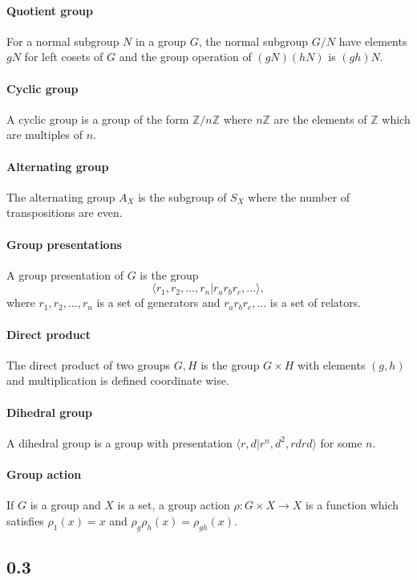 \documentclass[]{article}
\begin{document}
\paragraph{Quotient group} For a normal subgroup $N$ in a group $G$, the normal subgroup $G/N$ have elements $gN$ for left cosets of $G$ and the group operation of $(gN)(hN)$ is $(gh)N$. 
\paragraph{Cyclic group } A cyclic group is a group of the form $\mathbb{Z}/n\mathbb{Z}$ where $n\mathbb{Z}$ are the elements of $\mathbb{Z}$ which are multiples of $n$. 
\paragraph{Alternating group} The alternating group $A_X$ is the subgroup of $S_X$ where the number of transpositions are even. 
\paragraph{Group presentations} A group presentation of $G$ is the group 
\begin{equation}
	\langle r_1, r_2, ..., r_n | r_a r_b r_c, ...\rangle,
\end{equation}
where $r_1, r_2, ..., r_n$ is a set of generators and $r_a r_b r_c, ...$ is a set of relators.
\paragraph{Direct product} The direct product of two groups $G, H$ is the group $G \times H$ with elements $(g, h)$ and multiplication is defined coordinate wise.
\paragraph{Dihedral group} A dihedral group is a group with presentation $\langle r, d | r^n, d^2 , rdrd \rangle$ for some $n$. 
\paragraph{Group action} If $G$ is a group and $X$ is a set, a group action $\rho: G \times X \rightarrow X $ is a function which satisfies $\rho_1(x) = x$ and $\rho_g \rho_h(x) = \rho_{gh} (x)$. 

\subsection*{0.3}
\end{document}
